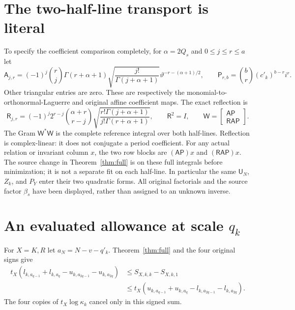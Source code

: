 \documentclass[11pt,a4paper]{article}
\begin{document}
\section{The two-half-line transport is literal}
To specify the coefficient comparison completely, for $\alpha=2Q_s$ and $0\le j\le r\le a$ let
\begin{equation}
 \mathsf A_{j,r}=(-1)^j\binom rj\Gamma(r+\alpha+1)
 \sqrt{\frac{j!}{\Gamma(j+\alpha+1)}}
 \vartheta^{-r-(\alpha+1)/2},\qquad
 \mathsf P_{r,b}=\binom br(c'_k)^{b-r}i^r .
 \label{eq:rowsAP}
\end{equation}
Other triangular entries are zero. These are respectively the monomial-to-orthonormal-Laguerre and original affine coefficient maps. The exact reflection is
\begin{equation}
 \mathsf R_{j,r}=(-1)^j2^{r-j}\binom{\alpha+r}{r-j}
  \sqrt{\frac{r!\Gamma(j+\alpha+1)}{j!\Gamma(r+\alpha+1)}},
 \qquad \mathsf R^2=I,
 \qquad \mathsf W=\begin{bmatrix}\mathsf A\mathsf P\\
                    \mathsf R\mathsf A\mathsf P\end{bmatrix}.
 \label{eq:W}
\end{equation}
The Gram $\mathsf W^*\mathsf W$ is the complete reference integral over both half-lines. Reflection is complex-linear: it does not conjugate a period coefficient. For any actual relation or invariant column $x$, the two row blocks are $(\mathsf A\mathsf P)x$ and $(\mathsf R\mathsf A\mathsf P)x$. The source change in Theorem~\ref{thm:full} is on these full integrals before minimization; it is not a separate fit on each half-line. In particular the same $\mathsf U_N$, $Z_k$, and $P_Y$ enter their two quadratic forms. All original factorials and the source factor $\beta_s$ have been displayed, rather than assigned to an unknown inverse.

\section{An evaluated allowance at scale $q_k$}
For $X=K,R$ let $a_N=N-v-q'_k$. Theorem~\ref{thm:full} and the four original signs give
\begin{equation}
\begin{split}
 t_X(l_{k,a_{q-1}}+l_{k,a_q}-u_{k,a_{2q-1}}-u_{k,a_{2q}})
 &\le S_{X,k,k}-S_{X,k,1}\\
 &\le t_X(u_{k,a_{q-1}}+u_{k,a_q}-l_{k,a_{2q-1}}-l_{k,a_{2q}}).
\end{split}\label{eq:allocationinterval}
\end{equation}
The four copies of $t_X\log\kappa_k$ cancel only in this signed sum.
\end{document}

